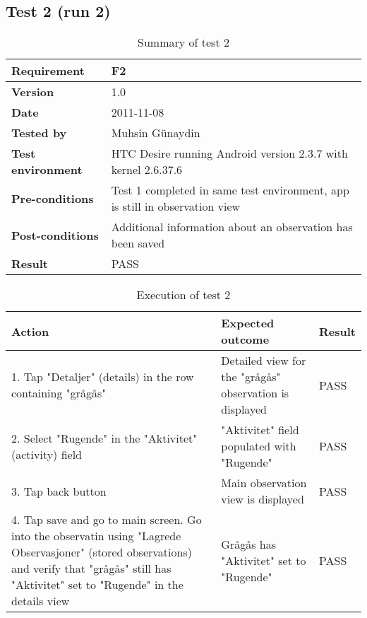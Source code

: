 \newpage
\subsection*{Test 2 (run 2)}

	\begin{table}[htb]
		\centering
		\begin{tabular}{|p{3.5cm}|p{7.0cm}|} \hline
			\textbf{Requirement} & F2 \\ \hline
			\textbf{Version} & 1.0 \\ \hline
			\textbf{Date} & 2011-11-08 \\ \hline
			\textbf{Tested by} & Muhsin Günaydin \\ \hline
			\textbf{Test environment} & HTC Desire running Android version 2.3.7 with kernel 2.6.37.6 \\ \hline
			\textbf{Pre-conditions} & Test 1 completed in same test environment, app is still in observation view \\ \hline
			\textbf{Post-conditions} & Additional information about an observation has been saved \\ \hline
			\textbf{Result} & PASS \\ \hline
		\end{tabular}
		\caption{Summary of test 2}
	\end{table}

	\begin{table}[htb]
		\centering

		\begin{tabular}{|p{5.0cm}|p{5.0cm}|p{1cm}|}
			\hline \textbf{Action} & \textbf{Expected outcome} & \textbf{Result} \\ \hline

			1. Tap "Detaljer" (details) in the row containing "grågås" &
			Detailed view for the "grågås" observation is displayed & 
			PASS \\ \hline

			2. Select "Rugende" in the "Aktivitet" (activity) field &
			"Aktivitet" field populated with "Rugende" &
			PASS \\ \hline

			3. Tap back button & 
			Main observation view is displayed & 
			PASS \\ \hline

			4. Tap save and go to main screen. Go into the observatin using
			"Lagrede Observasjoner" (stored observations) and verify that "grågås"
			still has "Aktivitet" set to "Rugende" in the details view &
			Grågås has "Aktivitet" set to "Rugende" &
			PASS \\ \hline
		\end{tabular}
		\caption{Execution of test 2}
	\end{table}

